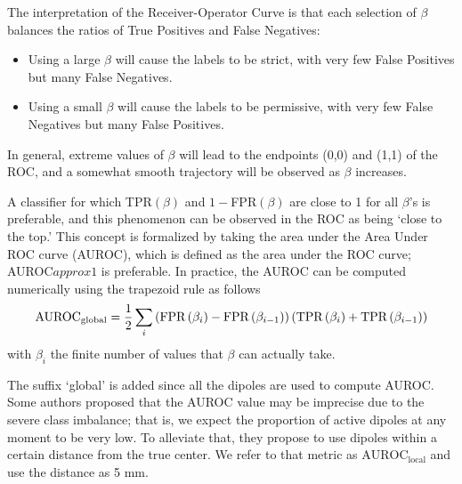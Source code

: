 The interpretation of the Receiver-Operator Curve is that each selection of $\beta$ balances the ratios of True Positives and False Negatives:
\begin{itemize}
\item 
Using a large $\beta$ will cause the labels to be strict, with very few False Positives but many False Negatives.
\item
Using a small $\beta$ will cause the labels to be permissive, with very few False Negatives but many False Positives.
\end{itemize}
In general, extreme values of $\beta$ will lead to the endpoints (0,0) and (1,1) of the ROC, and a somewhat smooth trajectory will be observed as $\beta$ increases.

A classifier for which TPR$(\beta)$ and $1-$FPR$(\beta)$ are close to 1 for all $\beta$'s is preferable, and this phenomenon can be observed in the ROC as being `close to the top.'
%
This concept is formalized by taking the area under the Area Under ROC curve (AUROC), which is defined as the area under the ROC curve; AUROC$approx 1$ is preferable.
%
In practice, the AUROC can be computed numerically using the trapezoid rule as follows
\begin{equation}
\text{AUROC}_\text{global} =
\frac{1}{2}
\sum_{i}
\left(  \text{FPR}\left( \beta_i \right)-\text{FPR}\left( \beta_{i-1} \right)  \right)
\left(  \text{TPR}\left( \beta_i \right)+\text{TPR}\left( \beta_{i-1} \right)  \right)
\end{equation}
with $\beta_i$ the finite number of values that $\beta$ can actually take.

The suffix `global' is added since all the dipoles are used to compute AUROC.
%
Some authors proposed that the AUROC value may be imprecise due to the severe class imbalance; that is, we expect the proportion of active dipoles at any moment to be very low.
%
To alleviate that, they propose to use dipoles within a certain distance from the true center.
%
We refer to that metric as $\text{AUROC}_\text{local}$ and use the distance as 5 \si{mm}.

